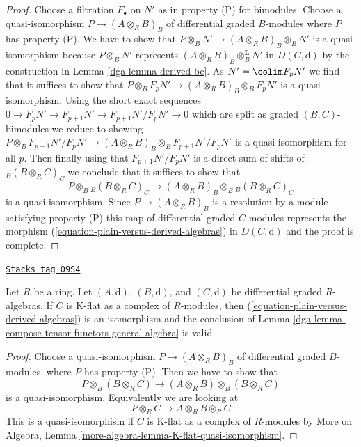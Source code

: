 \begin{proof}
\medskip\noindent
Choose a filtration $F_\bullet$ on $N'$ as in property (P) for bimodules.
Choose a quasi-isomorphism $P \to (A \otimes_R B)_B$
of differential graded $B$-modules where $P$ has property (P).
We have to show that
$P \otimes_B N' \to (A \otimes_R B)_B \otimes_B N'$ is
a quasi-isomorphism because $P \otimes_B N'$ represents
$(A \otimes_R B)_B \otimes_B^\mathbf{L} N'$ in $D(C, \text{d})$
by the construction in Lemma \ref{dga-lemma-derived-bc}.
As $N' = \colim F_pN'$ we find
that it suffices to show that
$P \otimes_B F_pN' \to (A \otimes_R B)_B \otimes_B F_pN'$
is a quasi-isomorphism. Using the short exact sequences
$0 \to F_pN' \to F_{p + 1}N' \to F_{p + 1}N'/F_pN' \to 0$
which are split as graded $(B, C)$-bimodules we reduce to showing
$P \otimes_B F_{p + 1}N'/F_pN' \to
(A \otimes_R B)_B \otimes_B F_{p + 1}N'/F_pN'$
is a quasi-isomorphism for all $p$.
Then finally using that $F_{p + 1}N'/F_pN'$
is a direct sum of shifts of ${}_B(B \otimes_R C)_C$
we conclude that it suffices to show that
$$
P \otimes_B {}_B(B \otimes_R C)_C \to
(A \otimes_R B)_B \otimes_B {}_B(B \otimes_R C)_C
$$
is a quasi-isomorphism. Since $P \to (A \otimes_R B)_B$
is a resolution by a module satisfying property (P)
this map of differential graded $C$-modules
represents the morphism (\ref{equation-plain-versus-derived-algebras})
in $D(C, \text{d})$ and the proof is complete.
\end{proof}

\begin{lemma}
\label{dga-lemma-compose-tensor-functors}
\href{https://stacks.math.columbia.edu/tag/09S4}{\texttt{Stacks tag 09S4}}

Let $R$ be a ring. Let $(A, \text{d})$, $(B, \text{d})$, and
$(C, \text{d})$ be differential graded $R$-algebras.
If $C$ is K-flat as a complex of $R$-modules, then
(\ref{equation-plain-versus-derived-algebras})
is an isomorphism and the conclusion of
Lemma \ref{dga-lemma-compose-tensor-functors-general-algebra} is valid.
\end{lemma}

\begin{proof}
Choose a quasi-isomorphism $P \to (A \otimes_R B)_B$ of differential
graded $B$-modules, where $P$ has property (P). Then we have to show
that
$$
P \otimes_B (B \otimes_R C) \longrightarrow
(A \otimes_R B) \otimes_B (B \otimes_R C)
$$
is a quasi-isomorphism. Equivalently we are looking at
$$
P \otimes_R C \longrightarrow
A \otimes_R B \otimes_R C
$$
This is a quasi-isomorphism if $C$ is K-flat as a complex of $R$-modules by
More on Algebra, Lemma \ref{more-algebra-lemma-K-flat-quasi-isomorphism}.
\end{proof}

